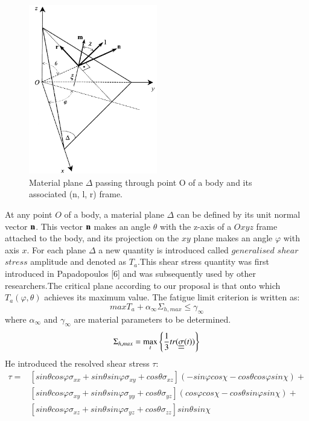 \documentclass[3p,times,procedia,number]{elsarticle}
\begin{document}
         \begin{figure}[h!]
         	\centering
         	\includegraphics[width=0.5\textwidth]{figures//demopp.png} 
         	\caption{Material plane $\Delta$ passing through point O of a body and its
         		associated (n, l, r) frame.}
         	\label{fig50}
         \end{figure}
         At any point $O$ of a body, a material plane $\Delta$ can be defined by its unit normal vector $\bf n$. This vector
         $\bf n$ makes an angle $\theta$ with the z-axis of a $Oxyz$ frame attached to the body, and its projection on the $xy$ plane
         makes an angle $\varphi$ with axis $x$. For each plane $\Delta$ a new quantity is introduced called $generalised$ $shear$ $stress$ amplitude and denoted as $T_a$.This shear stress quantity was first introduced in Papadopoulos [6]
         and was subsequently used by other researchers.The critical plane according to our proposal is that onto which $T_a(\varphi,\theta)$ achieves its maximum value. The fatigue limit criterion is written as:
         \begin{equation}
         	max T_a+\alpha_\infty \Sigma_{h,max}\leqslant \gamma_\infty
         \end{equation}
         where $\alpha_\infty$ and $\gamma_\infty$ are material parameters to be determined\cite{papadopoulos2001long}.
         $$\Sigma_{h,max}=\max\limits_{t}\left\lbrace \frac{1}{3}tr(\uline{\uline{\sigma}}(t))\right\rbrace $$
         He introduced the resolved shear stress $\tau$:
         \begin{equation}
         	\begin{split}
         		\tau=&[sin\theta cos\varphi\sigma_{xx}+sin\theta sin\varphi\sigma_{xy}+cos\theta\sigma_{xz}](-sin\varphi cos\chi-cos\theta cos\varphi sin\chi)+\\&[sin\theta cos\varphi\sigma_{xy}+sin\theta sin\varphi\sigma_{yy}+cos\theta\sigma_{yz}](cos\varphi cos\chi-cos\theta sin\varphi sin\chi)+\\&[sin\theta cos\varphi\sigma_{xz}+sin\theta sin\varphi\sigma_{yz}+cos\theta\sigma_{zz}]sin\theta sin\chi
         	\end{split} 
         	\label{eqres}
         \end{equation}
\end{document}
